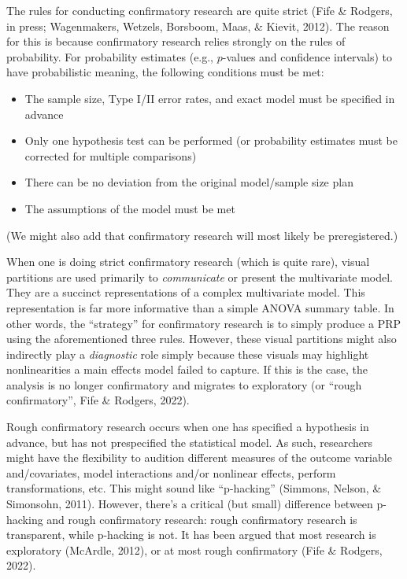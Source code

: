 \documentclass[
  man,floatsintext]{apa6}
\providecommand{\tightlist}{%
  \setlength{\itemsep}{0pt}\setlength{\parskip}{0pt}}
\begin{document}
The rules for conducting confirmatory research are quite strict (Fife \& Rodgers, in press; Wagenmakers, Wetzels, Borsboom, Maas, \& Kievit, 2012). The reason for this is because confirmatory research relies strongly on the rules of probability. For probability estimates (e.g., \(p\)-values and confidence intervals) to have probabilistic meaning, the following conditions must be met:

\begin{itemize}
\tightlist
\item
  The sample size, Type I/II error rates, and exact model must be specified in advance
\item
  Only one hypothesis test can be performed (or probability estimates must be corrected for multiple comparisons)
\item
  There can be no deviation from the original model/sample size plan
\item
  The assumptions of the model must be met
\end{itemize}

(We might also add that confirmatory research will most likely be preregistered.)

When one is doing strict confirmatory research (which is quite rare), visual partitions are used primarily to \emph{communicate} or present the multivariate model. They are a succinct representations of a complex multivariate model. This representation is far more informative than a simple ANOVA summary table. In other words, the ``strategy'' for confirmatory research is to simply produce a PRP using the aforementioned three rules. However, these visual partitions might also indirectly play a \emph{diagnostic} role simply because these visuals may highlight nonlinearities a main effects model failed to capture. If this is the case, the analysis is no longer confirmatory and migrates to exploratory (or ``rough confirmatory'', Fife \& Rodgers, 2022).

Rough confirmatory research occurs when one has specified a hypothesis in advance, but has not prespecified the statistical model. As such, researchers might have the flexibility to audition different measures of the outcome variable and/covariates, model interactions and/or nonlinear effects, perform transformations, etc. This might sound like ``p-hacking'' (Simmons, Nelson, \& Simonsohn, 2011). However, there's a critical (but small) difference between p-hacking and rough confirmatory research: rough confirmatory research is transparent, while p-hacking is not. It has been argued that most research is exploratory (McArdle, 2012), or at most rough confirmatory (Fife \& Rodgers, 2022).
\end{document}
